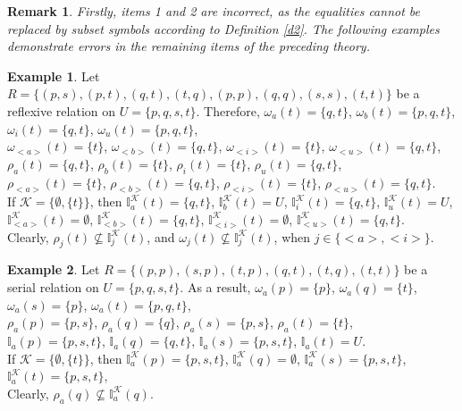 \documentclass{article}
\theoremstyle{theorem}
\newtheorem{remark}{Remark}[section]
\theoremstyle{definition}
\newtheorem{example}{Example}[section]
\theoremstyle{remark}
\begin{document}
\begin{remark}
Firstly, items 1 and 2 are incorrect, as the equalities cannot be replaced by subset symbols according to Definition \ref{d2}. The following examples demonstrate errors in the remaining items of the preceding theory.
\end{remark}
\color{black}
\begin{example}\label{e1} Let $R = \{(p, s), (p, t), (q, t), (t, q), (p, p), (q, q), (s, s), (t, t)\}$ be a reflexive relation on $U=\{p, q, s, t\}$. Therefore,
$\omega_{a}(t)=\{q, t\}$, $\omega_{b}(t)=\{p, q, t\}$, $\omega_{i}(t)=\{q, t\}$, $\omega_{u}(t)=\{p, q, t\}$,\\
 $\omega_{<a>}(t)=\{t\}$, $\omega_{<b>}(t)=\{q, t\}$, $\omega_{<i>}(t)=\{t\}$, $\omega_{<u>}(t)=\{q, t\}$,\\
 $\rho_{a}(t)=\{q, t\}$, $\rho_{b}(t)=\{t\}$, $\rho_{i}(t)=\{t\}$, $\rho_{u}(t)=\{q, t\}$,\\
 $\rho_{<a>}(t)=\{t\}$, $\rho_{<b>}(t)=\{q, t\}$, $\rho_{<i>}(t)=\{t\}$, $\rho_{<u>}(t)=\{q, t\}$.\\
 If $\mathcal{K} = \{\emptyset, \{t\}\}$, then
$\mathbb{I}^{\mathcal{K}}_{a}(t)=\{q, t\}$, $\mathbb{I}^{\mathcal{K}}_{b}(t)=U$, $\mathbb{I}^{\mathcal{K}}_{i}(t)=\{q, t\}$, $\mathbb{I}^{\mathcal{K}}_{u}(t)=U$,\\
 $\mathbb{I}^{\mathcal{K}}_{<a>}(t)=\emptyset$, $\mathbb{I}^{\mathcal{K}}_{<b>}(t)=\{q, t\}$, $\mathbb{I}^{\mathcal{K}}_{<i>}(t)=\emptyset$, $\mathbb{I}^{\mathcal{K}}_{<u>}(t)=\{q, t\}$.\\
 Clearly, $\rho_{j}(t) \nsubseteq \mathbb{I}^{\mathcal{K}}_{j}(t)$, and $\omega_{j}(t) \nsubseteq \mathbb{I}^{\mathcal{K}}_{j}(t)$, when $j\in\{<a>, <i>\}$.
\end{example}

\begin{example}\label{e18} Let $R = \{(p, p), (s, p), (t, p), (q, t), (t, q), (t, t)\}$ be a serial relation on $U=\{p, q, s, t\}$.
As a result,
  $\omega_{a}(p)=\{p\}$, $\omega_{a}(q)=\{t\}$, $\omega_{a}(s)=\{p\}$, $\omega_{a}(t)=\{p, q, t\}$,\\
  $\rho_{a}(p)=\{p, s\}$, $\rho_{a}(q)=\{q\}$, $\rho_{a}(s)=\{p, s\}$, $\rho_{a}(t)=\{t\}$,\\
 $\mathbb{I}_{a}(p)=\{p, s, t\}$, $\mathbb{I}_{a}(q)=\{q, t\}$, $\mathbb{I}_{a}(s)=\{p, s, t\}$, $\mathbb{I}_{a}(t)=U$.\\
 If $\mathcal{K} = \{\emptyset, \{t\}\}$, then $\mathbb{I}^{\mathcal{K}}_{a}(p)=\{p, s, t\}$, $\mathbb{I}^{\mathcal{K}}_{a}(q)=\emptyset$, $\mathbb{I}^{\mathcal{K}}_{a}(s)=\{p, s, t\}$, $\mathbb{I}^{\mathcal{K}}_{a}(t)=\{p, s, t\}$,\\
  Clearly, $\rho_{a}(q) \nsubseteq \mathbb{I}^{\mathcal{K}}_{a}(q)$.
\end{example}
\end{document}
